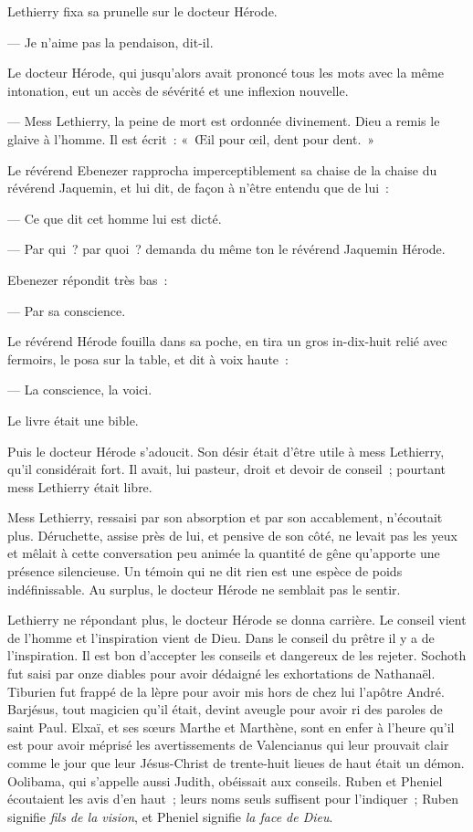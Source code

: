 \documentclass[french,twoside]{book} %
\begin{document}
Lethierry fixa sa prunelle sur le docteur Hérode.\par
— Je n’aime pas la pendaison, dit-il.\par
Le docteur Hérode, qui jusqu’alors avait prononcé tous les mots avec la même intonation, eut un accès de sévérité et une inflexion nouvelle.\par
— Mess Lethierry, la peine de mort est ordonnée divinement. Dieu a remis le glaive à l’homme. Il est écrit : « Œil pour œil, dent pour dent. »\par
Le révérend Ebenezer rapprocha imperceptiblement sa chaise de la chaise du révérend Jaquemin, et lui dit, de façon à n’être entendu que de lui :\par
— Ce que dit cet homme lui est dicté.\par
— Par qui ? par quoi ? demanda du même ton le révérend Jaquemin Hérode.\par
Ebenezer répondit très bas :\par
— Par sa conscience.\par
Le révérend Hérode fouilla dans sa poche, en tira un gros in-dix-huit relié avec fermoirs, le posa sur la table, et dit à voix haute :\par
— La conscience, la voici.\par
Le livre était une bible.\par
Puis le docteur Hérode s’adoucit. Son désir était d’être utile à mess Lethierry, qu’il considérait fort. Il avait, lui pasteur, droit et devoir de conseil ; pourtant mess Lethierry était libre.\par
Mess Lethierry, ressaisi par son absorption et par  son accablement, n’écoutait plus. Déruchette, assise près de lui, et pensive de son côté, ne levait pas les yeux et mêlait à cette conversation peu animée la quantité de gêne qu’apporte une présence silencieuse. Un témoin qui ne dit rien est une espèce de poids indéfinissable. Au surplus, le docteur Hérode ne semblait pas le sentir.\par
Lethierry ne répondant plus, le docteur Hérode se donna carrière. Le conseil vient de l’homme et l’inspiration vient de Dieu. Dans le conseil du prêtre il y a de l’inspiration. Il est bon d’accepter les conseils et dangereux de les rejeter. Sochoth fut saisi par onze diables pour avoir dédaigné les exhortations de Nathanaël. Tiburien fut frappé de la lèpre pour avoir mis hors de chez lui l’apôtre André. Barjésus, tout magicien qu’il était, devint aveugle pour avoir ri des paroles de saint Paul. Elxaï, et ses sœurs Marthe et Marthène, sont en enfer à l’heure qu’il est pour avoir méprisé les avertissements de Valencianus qui leur prouvait clair comme le jour que leur Jésus-Christ de trente-huit lieues de haut était un démon. Oolibama, qui s’appelle aussi Judith, obéissait aux conseils. Ruben et Pheniel écoutaient les avis d’en haut ; leurs noms seuls suffisent pour l’indiquer ; Ruben signifie \emph{fils de la vision}, et Pheniel signifie \emph{la face de Dieu}.\par
\end{document}
